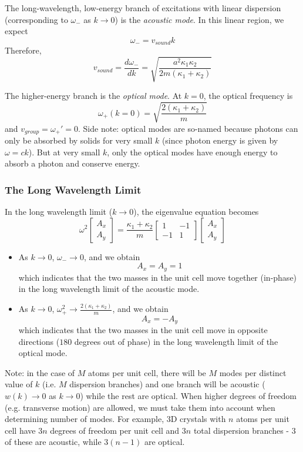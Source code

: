 \documentclass[10pt]{article}
\begin{document}
The long-wavelength, low-energy branch of excitations with linear dispersion (corresponding to $\omega_{-}$ as $k \rightarrow 0$) is the
\emph{acoustic mode}. In this linear region, we expect
$$\omega_{-} = v_{sound}k$$
Therefore,
$$v_{sound} = \frac{d\omega_{-}}{dk} = \sqrt{\frac{a^{2}\kappa_{1}\kappa_{2}}{2m(\kappa_{1}+\kappa_{2})}}$$

The higher-energy branch is the \emph{optical mode}. At $k = 0$, the optical frequency is
$$\omega_{+}(k = 0) = \sqrt{\frac{2(\kappa_{1} + \kappa_{2})}{m}}$$
and $v_{group} = \omega_{+}' = 0$. Side note: optical modes are so-named because photons can only be absorbed by solids for very small $k$ (since
photon energy is given by $\omega = ck$). But at very small $k$, only the optical modes have enough energy to absorb a photon and conserve energy.

\subsubsection{The Long Wavelength Limit}
In the long wavelength limit ($k \rightarrow 0$), the eigenvalue equation becomes
$$
\omega^{2} \begin{bmatrix}
A_{x}\\ A_{y}
\end{bmatrix} = \frac{\kappa_{1} + \kappa_{2}}{m}
\begin{bmatrix}
 1 & -1 \\
-1 & 1
\end{bmatrix}
\begin{bmatrix}
A_{x}\\ A_{y}
\end{bmatrix}
$$

\begin{itemize}
  \item As $k \rightarrow 0$, $\omega_{-} \rightarrow 0$, and we obtain
  $$A_{x} = A_{y} = 1$$
  which indicates that the two masses in the unit cell move together (in-phase) in the long wavelength limit
  of the acoustic mode.
  \item As $k \rightarrow 0$, $\omega_{+}^{2} \rightarrow \frac{2(\kappa_{1} + \kappa_{2})}{m}$, and we obtain
  $$A_{x} = -A_{y}$$
  which indicates that the two masses in the unit cell move in opposite directions ($180$ degrees out of phase) in
  the long wavelength limit of the optical mode.
\end{itemize}

Note: in the case of $M$ atoms per unit cell, there will be $M$ modes per distinct value of $k$ (i.e. $M$ dispersion branches) and one branch
will be acoustic ($w(k) \rightarrow 0$ as $k \rightarrow 0$) while the rest are optical. When higher degrees of freedom (e.g. transverse motion)
are allowed, we must take them into account when determining number of modes. For example, 3D crystals with $n$ atoms per unit cell have $3n$ degrees of
freedom per unit cell and $3n$ total dispersion branches - $3$ of these are acoustic, while $3(n-1)$ are optical.
\end{document}
